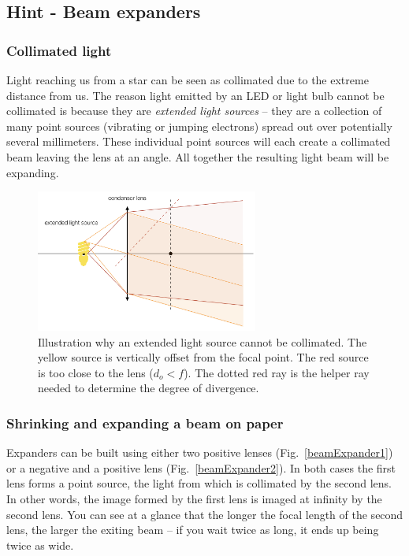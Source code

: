 \documentclass[a4paper]{report}
\begin{document}
    \clearpage

    \subsection{Hint - Beam expanders}
	\hypertarget{hintTo-expand}{}

	\subsubsection{Collimated light}
	Light reaching us from a star can be seen as collimated due to the extreme distance from us.
	The reason light emitted by an LED or light bulb cannot be collimated is because they are \emph{extended light sources} -- they are a collection of many point sources (vibrating or jumping electrons) spread out over potentially several millimeters.
	These individual point sources will each create a collimated beam leaving the lens at an angle. All together the resulting light beam will be expanding.


	\begin{figure}[h]
		\center
		\includegraphics[width=0.65\textwidth]{figures/collimated_led.png}
		\captionsetup{width=0.65\textwidth}
		\caption{Illustration why an extended light source cannot be collimated. The yellow source is vertically offset from the focal point. The red source is too close to the lens ($d_o<f$). The dotted red ray is the helper ray needed to determine the degree of divergence.}
		\label{collimation}
	\end{figure}

	\subsubsection{Shrinking and expanding a beam on paper}
	Expanders can be built using either two positive lenses (Fig.~\ref{beamExpander1}) or a negative and a positive lens (Fig.~\ref{beamExpander2}).
	In both cases the first lens forms a point source, the light from which is collimated by the second lens.
	In other words, the image formed by the first lens is imaged at infinity by the second lens.
	You can see at a glance that the longer the focal length of the second lens, the larger the exiting beam -- if you wait twice as long, it ends up being twice as wide.
\end{document}
